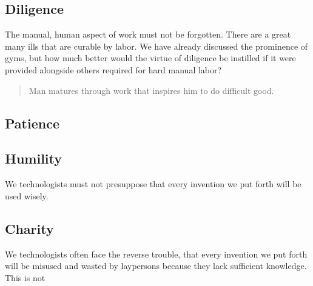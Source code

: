 \documentclass[letterpaper]{article}
\begin{document}
\subsection{Diligence}

The manual, human aspect of work must not be forgotten. There are a great many ills that are curable by labor. We have already discussed the prominence of gyms, but how much better would the virtue of diligence be instilled if it were provided alongside others required for hard manual labor?

\begin{quote}
  Man matures through work that inspires him to do difficult good.
\end{quote}

\hfill

\hfill

\hfill

\hfill

\subsection{Patience}
\hfill

\hfill

\hfill

\hfill

\hfill

\hfill

\hfill

\subsection{Humility}

We technologists must not presuppose that every invention we put forth will be used wisely.

\hfill

\hfill

\hfill

\hfill

\subsection{Charity}

We technologists often face the reverse trouble, that every invention we put forth will be misused and wasted by laypersons because they lack sufficient knowledge. This is not 

\hfill

\hfill

\hfill
\end{document}
